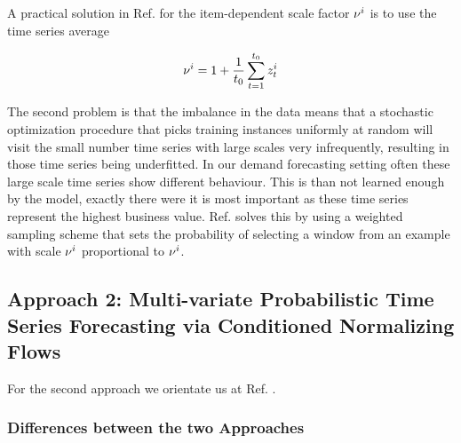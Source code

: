 \documentclass[11pt,headings=small]{scrartcl}
\begin{document}
A practical solution in Ref. \cite{SALINAS20201181} for the item-dependent scale factor $\nu^{i}$ is to use the time series average

\begin{equation}\label{scalefactor}
\nu^{i} = 1 + \frac{1}{t_{0}}\sum_{t=1}^{t_{0}}z^{i}_{t}
\end{equation}

The second problem is that the imbalance in the data means that a stochastic optimization procedure that picks training instances uniformly at random will visit the small number time series with large scales very infrequently, resulting in those time series being underfitted. In our demand forecasting setting often these large scale time series show different behaviour. This is than not learned enough by the model, exactly there were it is most important as these time series represent the highest business value. Ref. \cite{SALINAS20201181} solves this by using a weighted sampling scheme that sets the probability of selecting a window from an example with scale $\nu^{i}$ proportional to $\nu^{i}$.


\subsection{Approach 2: Multi-variate Probabilistic Time Series Forecasting via Conditioned Normalizing Flows}
\label{subsection:zalando}

For the second approach we orientate us at Ref. \cite{rasul2020multivariate}. 

\subsubsection{Differences between the two Approaches}
\label{subsubsection:diffapproach}
\end{document}
